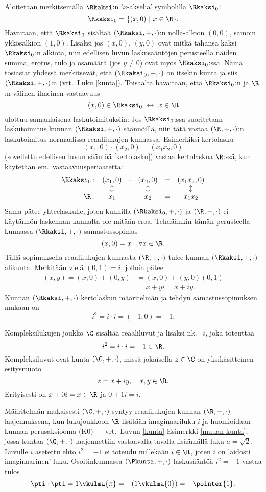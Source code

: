 Aloitetaan merkitsemällä $\Rkaksi$:n '$x$-akselia' symbolilla $\Rkaksi_0$:
\[
\Rkaksi_0 = \{(x,0) \ | \ x \in \R\}.
\]
Havaitaan, että $\Rkaksi_0$ sisältää $(\Rkaksi,+,\cdot)$:n nolla-alkion $(0,0)$, samoin 
ykkösalkion $(1,0)$. Lisäksi jos $(x,0)$, $(y,0)$ ovat mitkä tahansa kaksi $\Rkaksi_0$:n 
alkiota, niin edellisen luvun laskusääntöjen perusteella näiden summa, erotus, tulo ja
osamäärä (jos $y \neq 0$) ovat myös $\Rkaksi_0$:ssa. Nämä tosiasiat yhdessä merkitsevät, että 
$(\Rkaksi_0,+,\cdot)$ on itsekin kunta ja siis $(\Rkaksi,+,\cdot)$:n  
(vrt.\ Luku \ref{kunta}). Toisaalta havaitaan, että $\Rkaksi_0$:n ja  $\R$:n välinen ilmeinen
vastaavuus
\[
(x,0) \in \Rkaksi_0 \ \leftrightarrow \ x \in \R
\]  
ulottuu samanlaisena laskutoimituksiin: Jos $\Rkaksi_0$:ssa suoritetaan laskutoimitus kunnan 
$(\Rkaksi,+,\cdot)$ säännöillä, niin tätä vastaa $(\R,+,\cdot)$:n laskutoimitus normaalissa 
reaalilukujen kunnassa. Esimerkiksi kertolasku
\[
(x_1,0) \cdot (x_2,0) = (x_1x_2,0)
\]
(sovellettu edellisen luvun sääntöä \eqref{kertolasku}) vastaa kertolaskua $\R$:ssä, kun 
käytetään em.\ vastaavuusperiaatetta:
\[
\begin{array}{rccccc}
\Rkaksi_0: &(x_1,0) &\cdot &(x_2,0) &= &(x_1x_2,0) \\
&\updownarrow & &\updownarrow & &\updownarrow\\ 
\R: &x_1 &\cdot &x_2 &= &x_1x_2
\end{array}
\]
Sama pätee yhteelaskulle, joten kunnilla $(\Rkaksi_0,+,\cdot)$ ja $(\R,+,\cdot)$ ei käytännön 
laskennan kannalta ole mitään eroa. Tehdäänkin tämän perusteella kunnassa $(\Rkaksi,+,\cdot)$ 
samastussopimus
\[ (x,0) = x \quad \forall x \in \R. \]
Tällä sopimuksella reaalilukujen kunnasta $(\R,+,\cdot)$ tulee kunnan $(\Rkaksi,+,\cdot)$ 
alikunta. Merkitään vielä $(0,1)=i$, 
jolloin pätee
\begin{align*} 
(x,y) = (x,0) + (0,y) &= (x,0) + (y,0)(0,1) \\
                      &= x + yi = x+iy. 
\end{align*}
Kunnan $(\Rkaksi,+,\cdot)$ kertolaskun määritelmän ja tehdyn samastussopimuksen mukaan on
\[ 
i^2 = i \cdot i = (-1,0) = -1. 
\]
\begin{Def}  \label{kompleksilukujen määritelmä}
 
Kompleksilukujen joukko $\C$ sisältää reaaliluvut ja lisäksi nk.\  $i$,
joka toteuttaa
\[
i^2=i \cdot i = -1 \in \R. 
\]
Kompleksiluvut ovat kunta $(\C,+,\cdot)$, missä jokaisella $z\in\C$ on yksikäsitteinen
esitysmuoto
\[
z=x+iy, \quad x,y \in \R.
\]
Erityisesti on $x+0i=x\in\R$ ja $0+1i=i$.
\end{Def}
Määritelmän mukaisesti $(\C,+,\cdot)$ syntyy reaalilukujen kunnan $(\R,+,\cdot)$ laajennuksena,
kun lukujoukkoon $\R$ lisätään imaginaariluku $i$ ja huomioidaan kunnan perusaksiooma (K0)
--- vrt.\ Luvun \ref{kunta} Esimerkki \ref{muuan kunta}, jossa kuntaa $(\Q,+,\cdot)$ 
laajennettiin vastaavalla tavalla lisäämällä luku $a=\sqrt{2}$. Luvulle $i$ asetettu ehto 
$i^2=-1$ ei toteudu millekään $i\in\R$, joten $i$ on 'aidosti imaginaarinen' luku. 
Osoitinkunnassa $(\Pkunta, + , \cdot)$ laskusääntöä $i^2=-1$ vastaa tulos
\[
\pti \cdot \pti = 1 \vkulma{\pi} = -(1 \vkulma{0}) = - \pointer{1}.
\]

